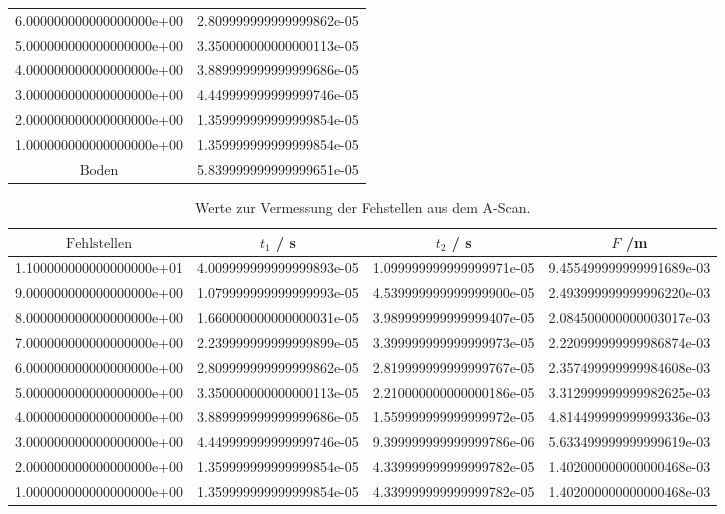 \begin{table}
{\begin{tabular}{S[scientific-notation= fixed, fixed-exponent = 0, round-precision = 0] S}
    6.000000000000000000e+00 & 2.809999999999999862e-05\\
    5.000000000000000000e+00 & 3.350000000000000113e-05\\
    4.000000000000000000e+00 & 3.889999999999999686e-05\\
    3.000000000000000000e+00 & 4.449999999999999746e-05\\
    2.000000000000000000e+00 & 1.359999999999999854e-05\\
    1.000000000000000000e+00 & 1.359999999999999854e-05\\
    $\text{Boden}$ & 5.839999999999999651e-05\\
    \bottomrule
  \end{tabular}
  \label{tab:ABB}
}
\end{table}
\begin{table}
  \centering
  \caption{Werte zur Vermessung der Fehstellen aus dem A-Scan.}
  \begin{tabular}{S[scientific-notation = fixed , fixed-exponent = 0, round-precision=0] S S S}
    \toprule
    $ \text{Fehlstellen} $& $ t_{1} $ / \si{\second}&  $ t_{2} $ / \si{\second} & $F$ /\si{\meter} \\
    \midrule
    1.100000000000000000e+01 & 4.009999999999999893e-05 & 1.099999999999999971e-05 & 9.455499999999991689e-03\\
    9.000000000000000000e+00 & 1.079999999999999993e-05 & 4.539999999999999900e-05 & 2.493999999999996220e-03\\
    8.000000000000000000e+00 & 1.660000000000000031e-05 & 3.989999999999999407e-05 & 2.084500000000003017e-03\\
    7.000000000000000000e+00 & 2.239999999999999899e-05 & 3.399999999999999973e-05 & 2.220999999999986874e-03\\
    6.000000000000000000e+00 & 2.809999999999999862e-05 & 2.819999999999999767e-05 & 2.357499999999984608e-03\\
    5.000000000000000000e+00 & 3.350000000000000113e-05 & 2.210000000000000186e-05 & 3.312999999999982625e-03\\
    4.000000000000000000e+00 & 3.889999999999999686e-05 & 1.559999999999999972e-05 & 4.814499999999999336e-03\\
    3.000000000000000000e+00 & 4.449999999999999746e-05 & 9.399999999999999786e-06 & 5.633499999999999619e-03\\
    2.000000000000000000e+00 & 1.359999999999999854e-05 & 4.339999999999999782e-05 & 1.402000000000000468e-03\\
    1.000000000000000000e+00 & 1.359999999999999854e-05 & 4.339999999999999782e-05 & 1.402000000000000468e-03\\
    \bottomrule
  \end{tabular}
  \label{tab:F1}
\end{table}
